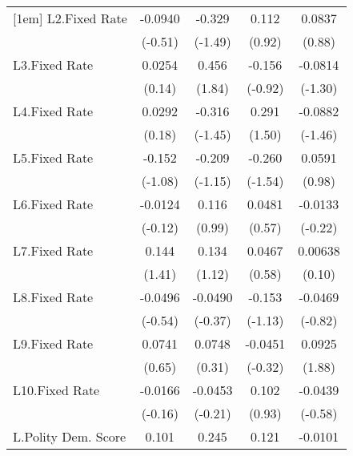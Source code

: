 {\begin{longtable}{l*{4}{c}}
[1em]
L2.Fixed Rate   &  -0.0940         &   -0.329         &    0.112         &   0.0837         \\
                &  (-0.51)         &  (-1.49)         &   (0.92)         &   (0.88)         \\
[1em]
L3.Fixed Rate   &   0.0254         &    0.456         &   -0.156         &  -0.0814         \\
                &   (0.14)         &   (1.84)         &  (-0.92)         &  (-1.30)         \\
[1em]
L4.Fixed Rate   &   0.0292         &   -0.316         &    0.291         &  -0.0882         \\
                &   (0.18)         &  (-1.45)         &   (1.50)         &  (-1.46)         \\
[1em]
L5.Fixed Rate   &   -0.152         &   -0.209         &   -0.260         &   0.0591         \\
                &  (-1.08)         &  (-1.15)         &  (-1.54)         &   (0.98)         \\
[1em]
L6.Fixed Rate   &  -0.0124         &    0.116         &   0.0481         &  -0.0133         \\
                &  (-0.12)         &   (0.99)         &   (0.57)         &  (-0.22)         \\
[1em]
L7.Fixed Rate   &    0.144         &    0.134         &   0.0467         &  0.00638         \\
                &   (1.41)         &   (1.12)         &   (0.58)         &   (0.10)         \\
[1em]
L8.Fixed Rate   &  -0.0496         &  -0.0490         &   -0.153         &  -0.0469         \\
                &  (-0.54)         &  (-0.37)         &  (-1.13)         &  (-0.82)         \\
[1em]
L9.Fixed Rate   &   0.0741         &   0.0748         &  -0.0451         &   0.0925         \\
                &   (0.65)         &   (0.31)         &  (-0.32)         &   (1.88)         \\
[1em]
L10.Fixed Rate  &  -0.0166         &  -0.0453         &    0.102         &  -0.0439         \\
                &  (-0.16)         &  (-0.21)         &   (0.93)         &  (-0.58)         \\
[1em]
L.Polity Dem. Score&    0.101         &    0.245         &    0.121         &  -0.0101         \\

\end{longtable}}
